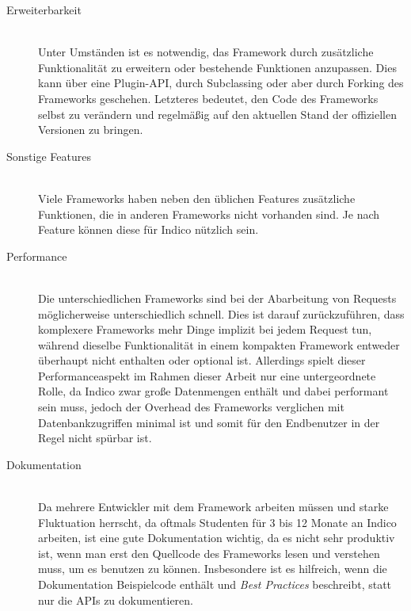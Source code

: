 \begin{description}
\item[Erweiterbarkeit] \hfill \\
Unter Umständen ist es notwendig, das Framework durch zusätzliche Funktionalität zu erweitern oder
bestehende Funktionen anzupassen. Dies kann über eine Plugin-API, durch Subclassing oder aber durch
Forking des Frameworks geschehen. Letzteres bedeutet, den Code des Frameworks selbst zu verändern
und regelmäßig auf den aktuellen Stand der offiziellen Versionen zu bringen.

\item[Sonstige Features] \hfill \\
Viele Frameworks haben neben den üblichen Features zusätzliche Funktionen, die in anderen Frameworks
nicht vorhanden sind. Je nach Feature können diese für Indico nützlich sein.

\item[Performance] \hfill \\
Die unterschiedlichen Frameworks sind bei der Abarbeitung von Requests möglicherweise
unterschiedlich schnell. Dies ist darauf zurückzuführen, dass komplexere Frameworks mehr Dinge
implizit bei jedem Request tun, während dieselbe Funktionalität in einem kompakten Framework
entweder überhaupt nicht enthalten oder optional ist. Allerdings spielt dieser Performanceaspekt
im Rahmen dieser Arbeit nur eine untergeordnete Rolle, da Indico zwar große Datenmengen enthält und
dabei performant sein muss, jedoch der Overhead des Frameworks verglichen mit Datenbankzugriffen
minimal ist und somit für den Endbenutzer in der Regel nicht spürbar ist.

\item[Dokumentation] \hfill \\
Da mehrere Entwickler mit dem Framework arbeiten müssen und starke Fluktuation herrscht, da oftmals
Studenten für 3 bis 12 Monate an Indico arbeiten, ist eine gute Dokumentation wichtig, da es nicht
sehr produktiv ist, wenn man erst den Quellcode des Frameworks lesen und verstehen muss, um es
benutzen zu können. Insbesondere ist es hilfreich, wenn die Dokumentation Beispielcode enthält und
\emph{Best Practices} beschreibt, statt nur die APIs zu dokumentieren.


\end{description}
